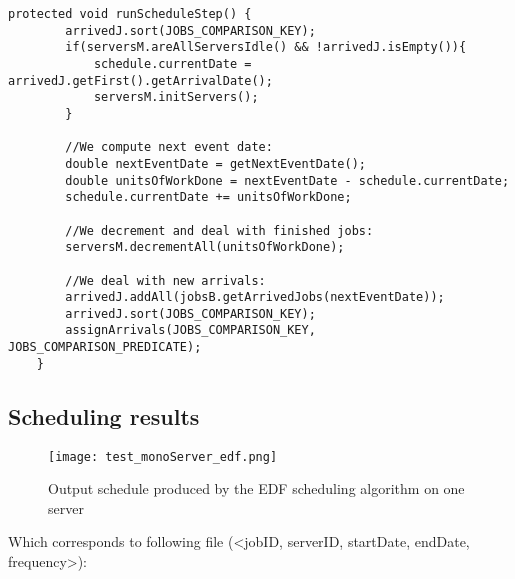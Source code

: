 \documentclass[./report.tex]{subfiles}
\begin{document}
\begin{lstlisting}[style=Java, caption={Source code of an EDF schedule step}]
	protected void runScheduleStep() {
		arrivedJ.sort(JOBS_COMPARISON_KEY);
		if(serversM.areAllServersIdle() && !arrivedJ.isEmpty()){
			schedule.currentDate = arrivedJ.getFirst().getArrivalDate();
			serversM.initServers();
		}
		
		//We compute next event date:
		double nextEventDate = getNextEventDate();
		double unitsOfWorkDone = nextEventDate - schedule.currentDate;
		schedule.currentDate += unitsOfWorkDone;
		
		//We decrement and deal with finished jobs:
		serversM.decrementAll(unitsOfWorkDone);
		
		//We deal with new arrivals:
		arrivedJ.addAll(jobsB.getArrivedJobs(nextEventDate));
		arrivedJ.sort(JOBS_COMPARISON_KEY);
		assignArrivals(JOBS_COMPARISON_KEY, JOBS_COMPARISON_PREDICATE);
	}
\end{lstlisting}


\newpage
\subsection{Scheduling results}
\begin{figure}[!h]
	\center
	\texttt{[image: test\_monoServer\_edf.png]}
	\caption{Output schedule produced by the EDF scheduling algorithm on one server}
	\label{fig:monoServer_edf} 
\end{figure}

Which corresponds to following file (<jobID, serverID, startDate, endDate, frequency>):


\newpage
\end{document}
